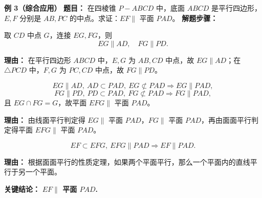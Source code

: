 \begin{examplebox}
	\medskip
	\textbf{\textcolor{CExample}{例 3（综合应用）}}
	\textbf{\textcolor{CExample}{题目：}}
	在四棱锥 $P-ABCD$ 中，底面 $ABCD$ 是平行四边形，$E,F$ 分别是 $AB,PC$ 的中点。求证：$EF\parallel$ 平面 $PAD$。
	\textbf{\textcolor{CExample}{解题步骤：}}
	\begin{description}[style=nextline, leftmargin=2.8em, labelsep=0.5em, itemsep=0.45em]
		\item[\textbf{第一步（构造中位线）：}]
			取 $CD$ 中点 $G$，连接 $EG,FG$，则
			\[
				EG\parallel AD,\quad FG\parallel PD.
			\]
			\par\textbf{理由：} 在平行四边形 $ABCD$ 中，$E,G$ 为 $AB,CD$ 中点，故 $EG\parallel AD$；在 $\triangle PCD$ 中，$F,G$ 为 $PC,CD$ 中点，故 $FG\parallel PD$。
		\item[\textbf{第二步（证面面平行）：}]
			\[
				EG\parallel AD,\ AD\subset PAD,\ EG\not\subset PAD \Rightarrow EG\parallel PAD,
			\]
			\[
				FG\parallel PD,\ PD\subset PAD,\ FG\not\subset PAD \Rightarrow FG\parallel PAD,
			\]
			且 $EG\cap FG=G$，故平面 $EFG\parallel$ 平面 $PAD$。
			\par\textbf{理由：} 由线面平行判定得 $EG\parallel$ 平面 $PAD$，$FG\parallel$ 平面 $PAD$，再由面面平行判定得平面 $EFG\parallel$ 平面 $PAD$。
		\item[\textbf{第三步（面面平行性质）：}]
			\[
				EF\subset EFG,\ EFG\parallel PAD \Rightarrow EF\parallel PAD.
			\]
			\par\textbf{理由：} 根据面面平行的性质定理，如果两个平面平行，那么一个平面内的直线平行于另一个平面。
	\end{description}
	\textbf{\textcolor{CExample}{关键结论：}}
	\textbf{$EF\parallel$ 平面 $PAD$.}
\end{examplebox}
